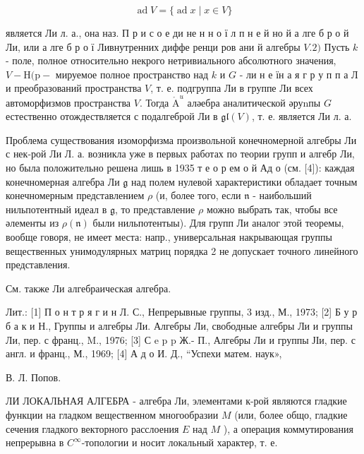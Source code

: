 \documentclass[10pt]{article}
\def\AA{\mathring{\mathrm{A}}}
\begin{document}
\[

\operatorname{ad} V=\{\operatorname{ad} x \mid x \in V\}

\]



является Ли л. а., она наз. П р и с о е ди не н н о ї л п н е й но й а лге б р о й Ли, или а лге б р о ї Ливнутренних диффе ренци ров ани й алгебры $V .2)$ Пусть $k$ - поле, полное относительно некрого нетривиального абсолютного значения, $V-\mathrm{H}(\mathrm{p}-$ мируемое полное пространство над $k$ и $G$ - ли н е їн а я г р у п п а Л и преобразований пространства $V$, т. е. подгруппа Ли в группе Ли всех автоморфизмов пространства $V$. Тогда $\AA^{u}$ аләебра аналитической әруnпы $G$ естественно отождествляется с подалгеброй Ли в $\mathfrak{g l}(V)$, т. е. является Ли л. а.



Проблема существования изоморфизма произвольной конечномерной алгебры Ли с нек-рой Ли Л. а. возникла уже в первых работах по теории групп и алгебр Ли, но была положительно решена лишь в 1935 т е о р ем о й Ад о (см. [4]): каждая конечномерная алгебра Ли $\mathfrak{g}$ над полем нулевой характеристики обладает точным конечномерным представлением $\rho$ (и, более того, если $\mathfrak{n}$ - наибольший нильпотентный идеал в $\mathfrak{g}$, то представление $\rho$ можно выбрать так, чтобы все әлементы из $\rho(\mathfrak{n})$ были нильпотентыы). Для групп Ли аналог этой теоремы, вообще говоря, не имеет места: напр., универсальная накрывающая группы вещественных унимодулярных матриц порядка 2 не допускает точного линейного представления.



См. также Ли алгебраическая алгебра.



Лит.: [1] П о н т р я г и н Л. С., Непрерывные группы, 3 изд., М., 1973; [2] Б у р б а к и Н., Группы и алгебры Ли. Алгебры Ли, свободные алгебры Ли и группы Ли, пер. с франц., M., 1976; [3] С e p p Ж.- П., Алгебры Ли и группы ЈІи, пер. с англ. и франц., М., 1969; [4] А д о И. Д., “Успехи матем. наук»,

В. Л. Попов.



ЛИ ЛОКАЛЬНАЯ АЛГЕБРА - алгебра Ли, элементами к-рой являются гладкие функции на гладком вещественном многообразии $M$ (или, более общо, гладкие сечения гладкого векторного расслоения $E$ над $M$ ), а операция коммутирования непрерывна в $C^{\infty}$-топологии и носит локальный характер, т. е.
\end{document}
